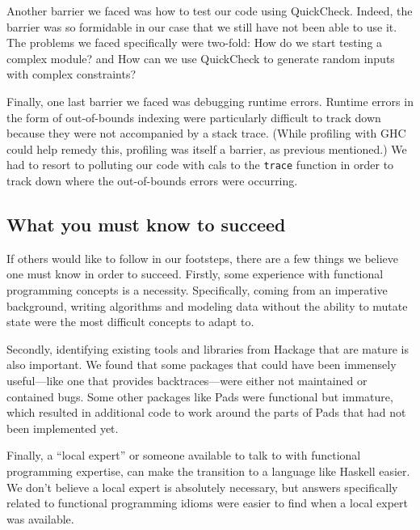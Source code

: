 \documentclass[preprint,nonatbib,blockstyle,nocopyrightspace,times]{sigplanconf}
\begin{document}
Another barrier we faced was how to test our code using QuickCheck.
Indeed, the barrier was so formidable in our case that we still have not been 
able to use it.
The problems we faced specifically were two-fold: How do we start testing
a complex module? and How can we use QuickCheck to generate random inputs with 
complex constraints?

Finally, one last barrier we faced was debugging runtime errors.
Runtime errors in the form of out-of-bounds indexing were particularly 
difficult to track down because they were not accompanied by a stack trace.
(While profiling with GHC could help remedy this, profiling was itself a 
barrier, as previous mentioned.)
We had to resort to polluting our code with cals to the \texttt{trace} function 
in order to track down where the out-of-bounds errors were occurring.


\subsection{What you must know to succeed}
If others would like to follow in our footsteps, there are a few
things we believe one must know in order to succeed.
Firstly, some experience with functional programming concepts is a necessity. 
Specifically, coming from an imperative background, writing algorithms and 
modeling data without the ability to mutate state were the most difficult 
concepts to adapt to.

Secondly, identifying existing tools and libraries from Hackage that are mature 
is also important.
We found that some packages that could have been immensely useful---like one 
that provides backtraces---were either not maintained or contained bugs.
Some other packages like Pads were functional but immature, which resulted in 
additional code to work around the parts of Pads that had not been implemented 
yet.

Finally, a ``local expert'' or someone available to talk to with functional 
programming expertise, can make the transition to a language like Haskell 
easier.
We don't believe a local expert is absolutely necessary, but answers 
specifically related to functional programming idioms were easier to find when 
a local expert was available.
\end{document}
